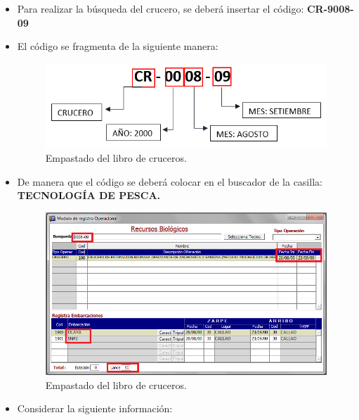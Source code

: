 \documentclass[a4paper,oneside,11pt]{book}
\begin{document}
\begin{itemize}
 
 \item Para realizar la búsqueda del crucero, se deberá insertar el código: \textbf{CR-9008-09}
 \item El código se fragmenta de la siguiente manera: 
 
 
  \begin{figure} [!h]
     \begin{center}
     \includegraphics[scale=0.8]{imagen_manual_OPEMAR/CODIGO.png}
      \caption{Empastado del libro de cruceros.}
     \end{center}
      \end{figure}
 
 \item De manera que el código se deberá colocar en el buscador de la casilla: \textbf{TECNOLOGÍA DE PESCA.}
 
 
 \begin{figure} [!h]
      \begin{center}
      \includegraphics[scale=0.7]{imagen_manual_OPEMAR/casilla1.png}
       \caption{Empastado del libro de cruceros.}
      \end{center}
       \end{figure}
 
 \item Considerar la siguiente información: 
 \begin{enumerate}


\end{enumerate}
\end{itemize}
\end{document}
